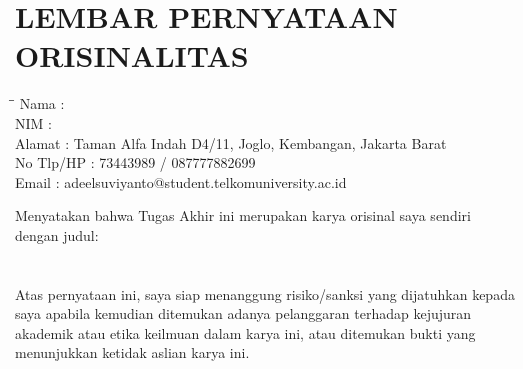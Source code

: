 \chapter*{LEMBAR PERNYATAAN ORISINALITAS}
\bigskip

\begin{tabbing}
	\hspace{30mm}\=\hspace{5mm}\=\kill
	Nama \> : \> \penulis \\
	NIM \> : \> \nim \\
	Alamat \> : \> Taman Alfa Indah D4/11, Joglo, Kembangan, Jakarta Barat \\
	No Tlp/HP \> :  73443989 / 087777882699 \\
	Email \> : \> adeelsuviyanto@student.telkomuniversity.ac.id \\
\end{tabbing}
\bigskip

\noindent Menyatakan bahwa Tugas Akhir ini merupakan karya orisinal saya sendiri dengan judul:
\bigskip\\
\textbf{\judul} \\
\textbf{\textit{\juduleng}}
\bigskip\\
Atas pernyataan ini, saya siap menanggung risiko/sanksi yang dijatuhkan kepada saya apabila kemudian ditemukan adanya pelanggaran terhadap kejujuran akademik atau etika keilmuan dalam karya ini, atau ditemukan bukti yang menunjukkan ketidak aslian karya ini.\\
\bigskip\\



